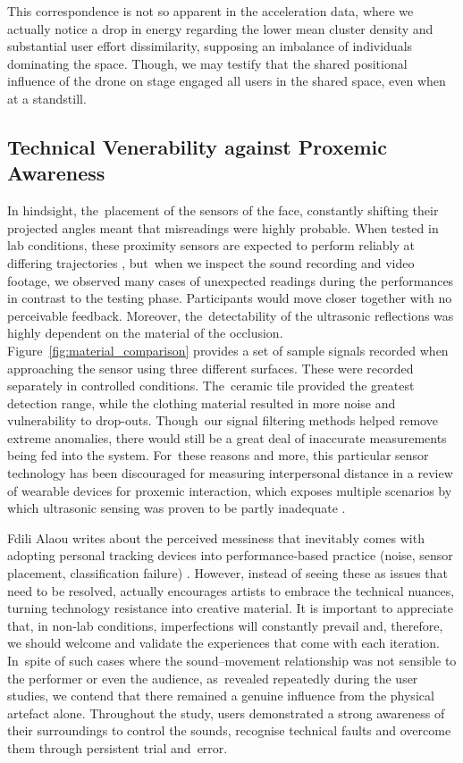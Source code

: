 This correspondence is not so apparent in the acceleration data, where we actually notice a drop in energy regarding the lower mean cluster density and substantial user effort dissimilarity, supposing an imbalance of individuals dominating the space. Though, we may testify that the shared positional influence of the drone on stage engaged all users in the shared space, even when at a standstill.

\subsection*{Technical Venerability against Proxemic Awareness}
\label{subsec:accuracy}

In hindsight, the~placement of the sensors of the face, constantly shifting their projected angles meant that misreadings were highly probable. When tested in lab conditions, these proximity sensors are expected to perform reliably at differing trajectories \citep{abreu_low-cost_2021}, but~when we inspect the sound recording and video footage, we observed many cases of unexpected readings during the performances in contrast to the testing phase. Participants would move closer together with no perceivable feedback. Moreover, the~detectability of the ultrasonic reflections was highly dependent on the material of the occlusion. Figure~\ref{fig:material_comparison} provides a set of sample signals recorded when approaching the sensor using three different surfaces. These were recorded separately in controlled conditions. The~ceramic tile provided the greatest detection range, while the clothing material resulted in more noise and vulnerability to drop-outs. Though~our signal filtering methods helped remove extreme anomalies, there would still be a great deal of inaccurate measurements being fed into the system. For~these reasons and more, this particular sensor technology has been discouraged for measuring interpersonal distance in a review of wearable devices for proxemic interaction, which exposes multiple scenarios by which ultrasonic sensing was proven to be partly inadequate \citep{montanari_measuring_2018}.

Fdili Alaou writes about the perceived messiness that inevitably comes with adopting personal tracking devices into performance-based practice (noise, sensor placement, classification failure) \cite{fdili_alaoui_making_2019}. However, instead of seeing these as issues that need to be resolved, actually encourages artists to embrace the technical nuances, turning technology resistance into creative material. It is important to appreciate that, in non-lab conditions, imperfections will constantly prevail and, therefore, we should welcome and validate the experiences that come with each iteration. In~spite of such cases where the sound--movement relationship was not sensible to the performer or even the audience, as~revealed repeatedly during the user studies, we contend that there remained a genuine influence from the physical artefact alone. Throughout the study, users demonstrated a strong awareness of their surroundings to control the sounds, recognise technical faults and overcome them through persistent trial and~error.

